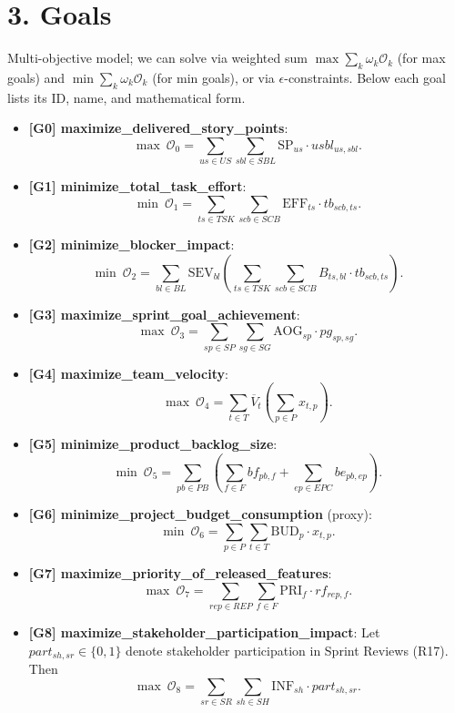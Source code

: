 \documentclass[11pt]{article}
\begin{document}
\section{3. Goals}
Multi-objective model; we can solve via weighted sum $\max \sum_k \omega_k \mathcal{O}_k$ (for max goals) and $\min \sum_k \omega_k \mathcal{O}_k$ (for min goals), or via $\epsilon$-constraints. Below each goal lists its ID, name, and mathematical form.

\begin{itemize}[leftmargin=*,itemsep=6pt]
  \item \textbf{[G0] maximize\_delivered\_story\_points}:
  \[
  \max \ \mathcal{O}_0=\sum_{us\in US}\sum_{sbl\in SBL} \text{SP}_{us}\cdot usbl_{us,sbl}.
  \]

  \item \textbf{[G1] minimize\_total\_task\_effort}:
  \[
  \min \ \mathcal{O}_1=\sum_{ts\in TSK}\sum_{scb\in SCB} \text{EFF}_{ts}\cdot tb_{scb,ts}.
  \]

  \item \textbf{[G2] minimize\_blocker\_impact}:
  \[
  \min \ \mathcal{O}_2=\sum_{bl\in BL}\text{SEV}_{bl}\left(\sum_{ts\in TSK}\sum_{scb\in SCB} B_{ts,bl}\cdot tb_{scb,ts}\right).
  \]

  \item \textbf{[G3] maximize\_sprint\_goal\_achievement}:
  \[
  \max \ \mathcal{O}_3=\sum_{sp\in SP}\sum_{sg\in SG} \text{AOG}_{sp}\cdot pg_{sp,sg}.
  \]

  \item \textbf{[G4] maximize\_team\_velocity}:
  \[
  \max \ \mathcal{O}_4=\sum_{t\in T} \overline{V}_{t}\left(\sum_{p\in P} x_{t,p}\right).
  \]

  \item \textbf{[G5] minimize\_product\_backlog\_size}:
  \[
  \min \ \mathcal{O}_5=\sum_{pb\in PB}\left(\sum_{f\in F} bf_{pb,f}+\sum_{ep\in EPC} be_{pb,ep}\right).
  \]

  \item \textbf{[G6] minimize\_project\_budget\_consumption} (proxy):
  \[
  \min \ \mathcal{O}_6=\sum_{p\in P}\sum_{t\in T} \text{BUD}_{p}\cdot x_{t,p}.
  \]

  \item \textbf{[G7] maximize\_priority\_of\_released\_features}:
  \[
  \max \ \mathcal{O}_7=\sum_{rep\in REP}\sum_{f\in F} \text{PRI}_{f}\cdot rf_{rep,f}.
  \]

  \item \textbf{[G8] maximize\_stakeholder\_participation\_impact}:
  Let $part_{sh,sr}\in\{0,1\}$ denote stakeholder participation in Sprint Reviews (R17). Then
  \[
  \max \ \mathcal{O}_8=\sum_{sr\in SR}\sum_{sh\in SH} \text{INF}_{sh}\cdot part_{sh,sr}.
  \]


\end{itemize}
\end{document}

